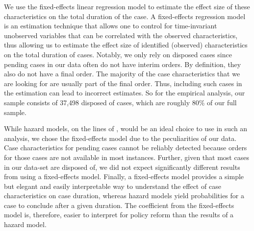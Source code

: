 \documentclass[12pt,a4paper]{article}
\begin{document}
	We use the fixed-effects linear regression model to estimate the effect size of these characteristics on the total duration of the case. A fixed-effects regression model is an estimation technique that allows one to control for time-invariant unobserved variables that can be correlated with the observed characteristics, thus allowing us to estimate the effect size of identified (observed) characteristics on the total duration of cases. Notably, we only rely on disposed cases since pending cases in our data often do not have interim orders. By definition, they also do not have a final order. The majority of the case characteristics that we are looking for are usually part of the final order. Thus, including such cases in the estimation can lead to incorrect estimates. So for the empirical analysis, our sample consists of 37,498 disposed of cases, which are roughly 80\% of our full sample. 
	
	While hazard models, on the lines of \textcite{datta2017_itatDelays}, would be an ideal choice to use in such an analysis, we chose the fixed-effects model due to the peculiarities of our data. Case characteristics for pending cases cannot be reliably detected because orders for those cases are not available in most instances. Further, given that most cases in our data-set are disposed of, we did not expect significantly different results from using a fixed-effects model. Finally, a fixed-effects model provides a simple but elegant and easily interpretable way to understand the effect of case characteristics on case duration, whereas hazard models yield probabilities for a case to conclude after a given duration. The coefficient from the fixed-effects model is, therefore, easier to interpret for policy reform than the results of a hazard model.
	
	
\end{document}
